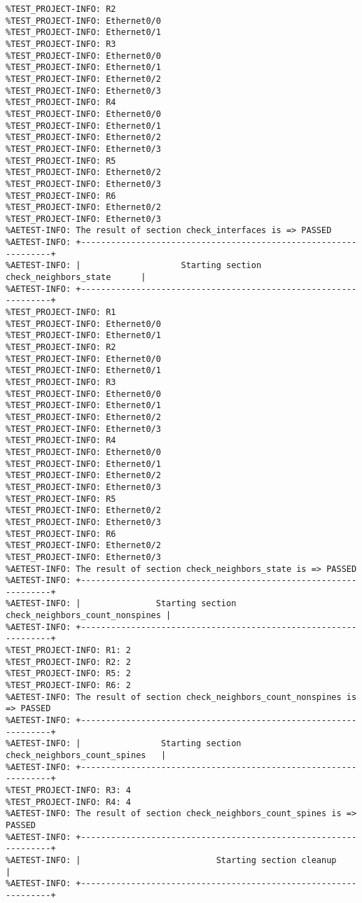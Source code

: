 \begin{verbatim}
%TEST_PROJECT-INFO: R2
%TEST_PROJECT-INFO: Ethernet0/0
%TEST_PROJECT-INFO: Ethernet0/1
%TEST_PROJECT-INFO: R3
%TEST_PROJECT-INFO: Ethernet0/0
%TEST_PROJECT-INFO: Ethernet0/1
%TEST_PROJECT-INFO: Ethernet0/2
%TEST_PROJECT-INFO: Ethernet0/3
%TEST_PROJECT-INFO: R4
%TEST_PROJECT-INFO: Ethernet0/0
%TEST_PROJECT-INFO: Ethernet0/1
%TEST_PROJECT-INFO: Ethernet0/2
%TEST_PROJECT-INFO: Ethernet0/3
%TEST_PROJECT-INFO: R5
%TEST_PROJECT-INFO: Ethernet0/2
%TEST_PROJECT-INFO: Ethernet0/3
%TEST_PROJECT-INFO: R6
%TEST_PROJECT-INFO: Ethernet0/2
%TEST_PROJECT-INFO: Ethernet0/3
%AETEST-INFO: The result of section check_interfaces is => PASSED
%AETEST-INFO: +----------------------------------------------------------------+
%AETEST-INFO: |                    Starting section check_neighbors_state      |
%AETEST-INFO: +----------------------------------------------------------------+
%TEST_PROJECT-INFO: R1
%TEST_PROJECT-INFO: Ethernet0/0
%TEST_PROJECT-INFO: Ethernet0/1
%TEST_PROJECT-INFO: R2
%TEST_PROJECT-INFO: Ethernet0/0
%TEST_PROJECT-INFO: Ethernet0/1
%TEST_PROJECT-INFO: R3
%TEST_PROJECT-INFO: Ethernet0/0
%TEST_PROJECT-INFO: Ethernet0/1
%TEST_PROJECT-INFO: Ethernet0/2
%TEST_PROJECT-INFO: Ethernet0/3
%TEST_PROJECT-INFO: R4
%TEST_PROJECT-INFO: Ethernet0/0
%TEST_PROJECT-INFO: Ethernet0/1
%TEST_PROJECT-INFO: Ethernet0/2
%TEST_PROJECT-INFO: Ethernet0/3
%TEST_PROJECT-INFO: R5
%TEST_PROJECT-INFO: Ethernet0/2
%TEST_PROJECT-INFO: Ethernet0/3
%TEST_PROJECT-INFO: R6
%TEST_PROJECT-INFO: Ethernet0/2
%TEST_PROJECT-INFO: Ethernet0/3
%AETEST-INFO: The result of section check_neighbors_state is => PASSED
%AETEST-INFO: +----------------------------------------------------------------+
%AETEST-INFO: |               Starting section check_neighbors_count_nonspines |
%AETEST-INFO: +----------------------------------------------------------------+
%TEST_PROJECT-INFO: R1: 2
%TEST_PROJECT-INFO: R2: 2
%TEST_PROJECT-INFO: R5: 2
%TEST_PROJECT-INFO: R6: 2
%AETEST-INFO: The result of section check_neighbors_count_nonspines is => PASSED
%AETEST-INFO: +----------------------------------------------------------------+
%AETEST-INFO: |                Starting section check_neighbors_count_spines   |
%AETEST-INFO: +----------------------------------------------------------------+
%TEST_PROJECT-INFO: R3: 4
%TEST_PROJECT-INFO: R4: 4
%AETEST-INFO: The result of section check_neighbors_count_spines is => PASSED
%AETEST-INFO: +----------------------------------------------------------------+
%AETEST-INFO: |                           Starting section cleanup             |
%AETEST-INFO: +----------------------------------------------------------------+

\end{verbatim}
